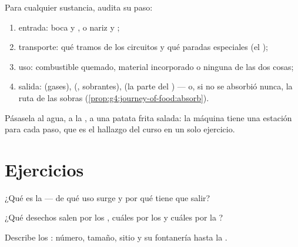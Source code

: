 \begin{method}\label{met:g7:removing-wastes:audit}
Para cualquier sustancia, audita su paso:
\begin{enumerate}
  \item entrada: boca y , o nariz y ;
  \item transporte: qué tramos de los circuitos y qué paradas
        especiales (el );
  \item uso: combustible quemado, material incorporado o ninguna de las
        dos cosas;
  \item salida:  (gases),  (, sobrantes),  (la
        parte del ) --- o, si no se absorbió nunca, la ruta de las
        sobras (\cref{prop:g4:journey-of-food:absorb}).
\end{enumerate}
Pásasela al agua, a la , a una patata frita salada: la máquina
tiene una estación para cada paso, que es el hallazgo del curso en un
solo ejercicio.
\end{method}

\section{Ejercicios}

\begin{exercise}[$\star$]\label{exo:g7:removing-wastes:1}
¿Qué es la  --- de qué uso surge y por qué tiene que salir?
\end{exercise}

\begin{exercise}[$\star$]\label{exo:g7:removing-wastes:2}
¿Qué desechos salen por los , cuáles por los  y cuáles
por la ?
\end{exercise}

\begin{exercise}[$\star$]\label{exo:g7:removing-wastes:3}
Describe los : número, tamaño, sitio y su fontanería hasta la
.
\end{exercise}


